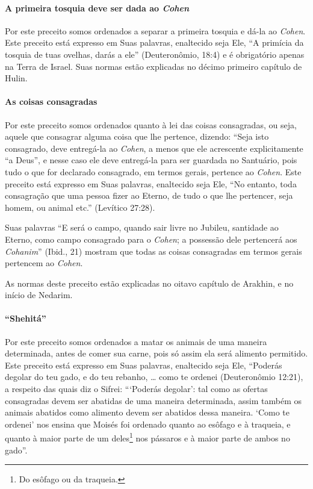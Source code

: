 \paragraph{A primeira tosquia deve ser dada ao \textit{Cohen}}

Por este preceito somos ordenados a separar a primeira tosquia e dá-la
ao \textit{Cohen}. Este preceito está expresso em Suas palavras, enaltecido
seja Ele, ``A primícia da tosquia de tuas ovelhas, darás a ele''
(Deuteronômio, 18:4) e é obrigatório apenas na Terra de Israel. Suas
normas estão explicadas no décimo primeiro capítulo de Hulin.

\paragraph{As coisas consagradas}

Por este preceito somos ordenados quanto à lei das coisas consagradas,
ou seja, aquele que consagrar alguma coisa que lhe pertence, dizendo:
``Seja isto consagrado, deve entregá-la ao \textit{Cohen}, a menos que ele
acrescente explicitamente ``a Deus'', e nesse caso ele deve entregá-la
para ser guardada no Santuário, pois tudo o que for declarado
consagrado, em termos gerais, pertence ao \textit{Cohen}. Este preceito está
expresso em Suas palavras, enaltecido seja Ele, ``No entanto, toda
consagração que uma pessoa fizer ao Eterno, de tudo o que lhe pertencer,
seja homem, ou animal etc.'' (Levítico 27:28).

Suas palavras ``E será o campo, quando sair livre no Jubileu, santidade
ao Eterno, como campo consagrado para o \textit{Cohen}; a possessão dele
pertencerá aos \textit{Cohanim}'' (Ibid., 21) mostram que todas as coisas
consagradas em termos gerais pertencem ao \textit{Cohen}.

As normas deste preceito estão explicadas no oitavo capítulo de
Arakhin, e no início de Nedarim.

\paragraph{``Shehitá''}

Por este preceito somos ordenados a matar os animais de uma maneira
determinada, antes de comer sua carne, pois só assim ela será alimento
permitido. Este preceito está expresso em Suas palavras, enaltecido seja
Ele, ``Poderás degolar do teu gado, e do teu rebanho, \ldots{} como te
ordenei (Deuteronômio 12:21), a respeito das quais diz o Sifrei:
```Poderás degolar': tal como as ofertas consagradas devem ser abatidas
de uma maneira determinada, assim também os animais abatidos como
alimento devem ser abatidos dessa maneira. `Como te ordenei' nos ensina
que Moisés foi ordenado quanto ao esôfago e à traqueia, e quanto à maior
parte de um deles\footnote{Do esôfago ou da traqueia.} nos pássaros e à maior parte de
ambos no gado''.

